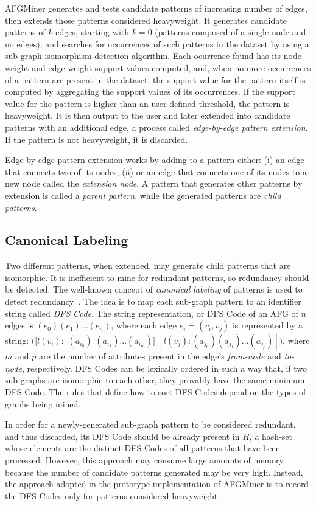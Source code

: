 AFGMiner generates and tests candidate patterns of increasing number of edges, then extends those patterns considered heavyweight. It generates candidate patterns of $k$ edges, starting with $k = 0$ (patterns composed of a single node and no edges), and searches for occurrences of such patterns in the dataset by using a sub-graph isomorphism detection algorithm. Each ocurrence found has its node weight and edge weight support values computed, and, when no more occurrences of a pattern are present in the dataset, the support value for the pattern itself is computed by aggregating the support values of its occurrences. If the support value for the pattern is higher than an user-defined threshold, the pattern is heavyweight. It is then output to the user and later extended into candidate patterns with an additional edge, a process called \emph{edge-by-edge pattern extension}. If the pattern is not heavyweight, it is discarded. 

Edge-by-edge pattern extension works by adding to a pattern either: (i) an edge that connects two of its nodes; (ii) or an edge that connects one of its nodes to a new node called the \emph{extension node}. A pattern that generates other patterns by extension is called a \emph{parent pattern}, while the generated patterns are \emph{child patterns}.

\subsection{Canonical Labeling}
Two different patterns, when extended, may generate child patterns that are isomorphic. It is inefficient to mine for redundant patterns, so redundancy should be detected. The well-known concept of \emph{canonical labeling} of patterns is used to detect redundancy~\cite{gSpan}. The idea is to map each sub-graph pattern to an identifier string called \emph{DFS Code}. The string representation, or DFS Code of an AFG of $n$ edges is $(e_0) (e_1)...(e_n)$, where each edge $e_i=(v_i, v_j)$ is represented by a string: $( [l(v_i):$ $(a_{i_0})$ $(a_{i_1})...(a_{i_m})]$ $[l(v_j): (a_{j_0}) (a_{j_1})...(a_{j_p})] )$, where $m$ and $p$ are the number of attributes present in the edge's \emph{from-node} and \emph{to-node}, respectively. DFS Codes can be lexically ordered in such a way that, if two sub-graphs are isomorphic to each other, they provably have the same minimum DFS Code. The rules that define how to sort DFS Codes depend on the types of graphs being mined. 

In order for a newly-generated sub-graph pattern to be considered redundant, and thus discarded, its DFS Code should be already present in $H$, a hash-set whose elements are the distinct DFS Codes of all patterns that have been processed. However, this approach may consume large amounts of memory because the number of candidate patterns generated may be very high. Instead, the approach adopted in the prototype implementation of AFGMiner is to record the DFS Codes only for patterns considered heavyweight. 

